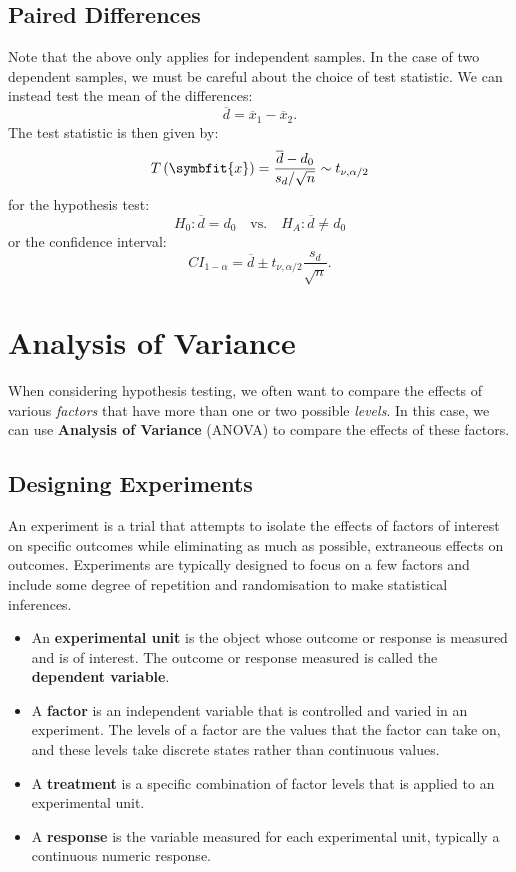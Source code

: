 \documentclass{article}
\begin{document}
\subsection{Paired Differences}
Note that the above only applies for independent samples.
In the case of two dependent samples, we must be careful about the choice
of test statistic. We can instead test the mean of the differences:
\begin{equation*}
    \overline{d} = \overline{x}_1 - \overline{x}_2.
\end{equation*}
The test statistic is then given by:
\begin{equation*}
    T\left( \symbfit{x} \right) = \frac{\overline{d} - d_0}{s_d / \sqrt{n}} \sim t_{\nu, \alpha/2}
\end{equation*}
for the hypothesis test:
\begin{equation*}
    H_0: \overline{d} = d_0 \quad \text{vs.} \quad H_A: \overline{d} \neq d_0
\end{equation*}
or the confidence interval:
\begin{equation*}
    CI_{1-\alpha} = \overline{d} \pm t_{\nu, \alpha/2} \frac{s_d}{\sqrt{n}}.
\end{equation*}
\section{Analysis of Variance}
When considering hypothesis testing, we often want to compare the effects of various \textit{factors} that have more
than one or two possible \textit{levels}. In this case, we can use \textbf{Analysis of Variance} (ANOVA) to compare the
effects of these factors.
\subsection{Designing Experiments}
An experiment is a trial that attempts to isolate the effects of factors of interest on specific outcomes while
eliminating as much as possible, extraneous effects on outcomes. Experiments are typically designed to focus on a few factors and include
some degree of repetition and randomisation to make statistical inferences.
\begin{itemize}
    \item An \textbf{experimental unit} is the object whose outcome or response is measured and is of interest. The outcome or response measured is called the \textbf{dependent variable}.
    \item A \textbf{factor} is an independent variable that is controlled and varied in an experiment. The levels of a factor are the values that the factor can take on, and these levels take discrete states rather than continuous values.
    \item A \textbf{treatment} is a specific combination of factor levels that is applied to an experimental unit.
    \item A \textbf{response} is the variable measured for each experimental unit, typically a continuous numeric response.
\end{itemize}
\end{document}
